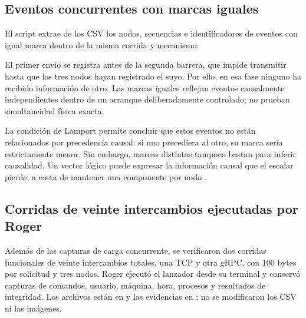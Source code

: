 \begin{table}[htbp]
\centering
\small
{}
\caption{Conteos verificados sobre los registros crudos de concurrencia.
Un par corresponde a un envío y su recepción, no a un RTT medido.}
\label{tab:verificacion-concurrencia}
\end{table}

\subsection{Eventos concurrentes con marcas iguales}
El script extrae de los CSV los nodos, secuencias e identificadores de eventos
con igual marca dentro de la misma corrida y mecanismo:


El primer envío se registra antes de la segunda barrera, que impide transmitir
hasta que los tres nodos hayan registrado el suyo. Por ello, en esa fase ninguno
ha recibido información de otro. Las marcas iguales reflejan eventos
causalmente independientes dentro de un arranque deliberadamente controlado;
no prueban simultaneidad física exacta.

La condición de Lamport permite concluir que estos eventos no están relacionados
por precedencia causal: si uno precediera al otro, su marca sería estrictamente
menor. Sin embargo, marcas distintas tampoco bastan para inferir causalidad.
Un vector lógico puede expresar la información causal que el escalar pierde,
a costa de mantener una componente por nodo \cite{vanSteenTanenbaum2023}.

\subsection{Corridas de veinte intercambios ejecutadas por Roger}
Además de las capturas de carga concurrente, se verificaron dos corridas
funcionales de veinte intercambios totales, una TCP y otra gRPC, con 100 bytes
por solicitud y tres nodos. Roger ejecutó el lanzador desde su terminal y
conservó capturas de comandos, usuario, máquina, hora, procesos y resultados
de integridad. Los archivos están en  y las evidencias en
; no se modificaron los CSV ni las imágenes.

